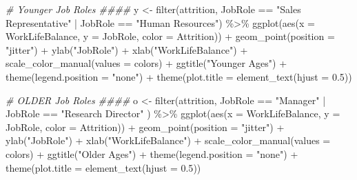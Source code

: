 \documentclass[
]{article}
\newenvironment{Shaded}{\begin{snugshade}}{\end{snugshade}}
\newcommand{\AttributeTok}[1]{\textcolor[rgb]{0.77,0.63,0.00}{#1}}
\newcommand{\CommentTok}[1]{\textcolor[rgb]{0.56,0.35,0.01}{\textit{#1}}}
\newcommand{\FloatTok}[1]{\textcolor[rgb]{0.00,0.00,0.81}{#1}}
\newcommand{\FunctionTok}[1]{\textcolor[rgb]{0.00,0.00,0.00}{#1}}
\newcommand{\NormalTok}[1]{#1}
\newcommand{\OtherTok}[1]{\textcolor[rgb]{0.56,0.35,0.01}{#1}}
\newcommand{\SpecialCharTok}[1]{\textcolor[rgb]{0.00,0.00,0.00}{#1}}
\newcommand{\StringTok}[1]{\textcolor[rgb]{0.31,0.60,0.02}{#1}}
\begin{document}
\begin{Shaded}
\begin{Highlighting}[]
\CommentTok{\# Younger Job Roles \#\#\#\#}
\NormalTok{y }\OtherTok{\textless{}{-}} \FunctionTok{filter}\NormalTok{(attrition, JobRole }\SpecialCharTok{==} \StringTok{"Sales Representative"} \SpecialCharTok{|}\NormalTok{ JobRole }\SpecialCharTok{==} \StringTok{"Human Resources"}\NormalTok{) }\SpecialCharTok{\%\textgreater{}\%}
  \FunctionTok{ggplot}\NormalTok{(}\FunctionTok{aes}\NormalTok{(}\AttributeTok{x =}\NormalTok{ WorkLifeBalance, }\AttributeTok{y =}\NormalTok{ JobRole, }\AttributeTok{color =}\NormalTok{ Attrition)) }\SpecialCharTok{+}
  \FunctionTok{geom\_point}\NormalTok{(}\AttributeTok{position =} \StringTok{"jitter"}\NormalTok{) }\SpecialCharTok{+}
  \FunctionTok{ylab}\NormalTok{(}\StringTok{"JobRole"}\NormalTok{) }\SpecialCharTok{+}
  \FunctionTok{xlab}\NormalTok{(}\StringTok{"WorkLifeBalance"}\NormalTok{) }\SpecialCharTok{+}
  \FunctionTok{scale\_color\_manual}\NormalTok{(}\AttributeTok{values =}\NormalTok{ colors) }\SpecialCharTok{+}
  \FunctionTok{ggtitle}\NormalTok{(}\StringTok{"Younger Ages"}\NormalTok{) }\SpecialCharTok{+}
  \FunctionTok{theme}\NormalTok{(}\AttributeTok{legend.position =} \StringTok{"none"}\NormalTok{) }\SpecialCharTok{+}
  \FunctionTok{theme}\NormalTok{(}\AttributeTok{plot.title =} \FunctionTok{element\_text}\NormalTok{(}\AttributeTok{hjust =} \FloatTok{0.5}\NormalTok{)) }
  

\CommentTok{\# OLDER Job Roles \#\#\#\#}
\NormalTok{o }\OtherTok{\textless{}{-}} \FunctionTok{filter}\NormalTok{(attrition, JobRole }\SpecialCharTok{==} \StringTok{"Manager"} \SpecialCharTok{|}\NormalTok{ JobRole }\SpecialCharTok{==} \StringTok{"Research Director"}\NormalTok{ ) }\SpecialCharTok{\%\textgreater{}\%}
  \FunctionTok{ggplot}\NormalTok{(}\FunctionTok{aes}\NormalTok{(}\AttributeTok{x =}\NormalTok{ WorkLifeBalance, }\AttributeTok{y =}\NormalTok{ JobRole, }\AttributeTok{color =}\NormalTok{ Attrition)) }\SpecialCharTok{+}
  \FunctionTok{geom\_point}\NormalTok{(}\AttributeTok{position =} \StringTok{"jitter"}\NormalTok{) }\SpecialCharTok{+}
  \FunctionTok{ylab}\NormalTok{(}\StringTok{"JobRole"}\NormalTok{) }\SpecialCharTok{+}
  \FunctionTok{xlab}\NormalTok{(}\StringTok{"WorkLifeBalance"}\NormalTok{) }\SpecialCharTok{+}
  \FunctionTok{scale\_color\_manual}\NormalTok{(}\AttributeTok{values =}\NormalTok{ colors) }\SpecialCharTok{+}
  \FunctionTok{ggtitle}\NormalTok{(}\StringTok{"Older Ages"}\NormalTok{) }\SpecialCharTok{+}
  \FunctionTok{theme}\NormalTok{(}\AttributeTok{legend.position =} \StringTok{"none"}\NormalTok{) }\SpecialCharTok{+}
  \FunctionTok{theme}\NormalTok{(}\AttributeTok{plot.title =} \FunctionTok{element\_text}\NormalTok{(}\AttributeTok{hjust =} \FloatTok{0.5}\NormalTok{)) }



\end{Highlighting}
\end{Shaded}
\end{document}
